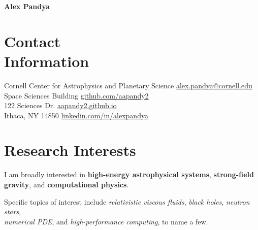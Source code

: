 \documentclass[margin,line,11pt]{resume}
\begin{document}
{\Huge \textbf{Alex Pandya}}
\begin{resume}


\section{\mysidestyle Contact\\Information}

\faHome \space Cornell Center for Astrophysics and Planetary Science \hfill \faEnvelope\hspace{0.7mm} \href{mailto:alex.pandya@cornell.edu}{alex.pandya@cornell.edu} \hspace{3.8mm} \hphantom{.}\\
\hphantom{.}\hspace{3.5mm} Space Sciences Building \hfill \faGithub \hspace{1.2mm} \href{https://github.com/aapandy2}{github.com/aapandy2} \hspace{9mm}\hphantom{.}\\
\hphantom{.}\hspace{3.5mm} 122 Sciences Dr. \hfill \faTv \hspace{0.5mm} \href{https://aapandy2.github.io/}{aapandy2.github.io}\hspace{15mm}\hphantom{.}\\
\hphantom{.}\hspace{3.7mm} Ithaca, NY 14850 \hfill \faLinkedin \hspace{1mm} \href{https://linkedin.com/in/alexpandya}{linkedin.com/in/alexpandya}\hspace{0mm}\hphantom{.} \\ 


\section{\mysidestyle Research Interests}

I am broadly interested in \textbf{high-energy astrophysical systems}, \textbf{strong-field gravity}, and \textbf{computational physics}.  

Specific topics of interest include \textit{relativistic viscous fluids}, \textit{black holes}, \textit{neutron stars}, \\
\textit{numerical PDE}, and \textit{high-performance computing}, to name a few.
\vspace{5mm}


\end{resume}
\end{document}
